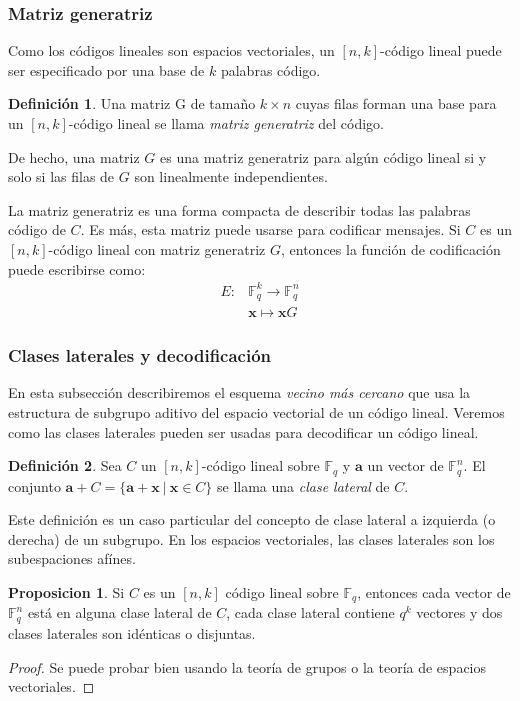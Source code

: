 \documentclass[a4paper,11pt]{article}
\numberwithin{equation}{section}
\theoremstyle{definition} %
\newtheorem{proposicion}{Proposicion}[section]
\newtheorem{definicion}{Definición}[section]
\renewcommand{\a}{\mathbf{a}}
\newcommand{\x}{\mathbf{x}}
\newcommand{\Fq}{\mathbb{F}_q}
\newcommand{\Fqn}{\mathbb{F}_q^n}
\newcommand{\Fqk}{\mathbb{F}_q^k}
\begin{document}
    \subsubsection{Matriz generatriz}

    Como los códigos lineales son espacios vectoriales, un $[n, k]$-código lineal puede ser especificado por una base de $k$ palabras código.

    \begin{definicion}
        Una matriz G de tamaño $k \times n$ cuyas filas forman una base para un $[n, k]$-código lineal se llama \emph{matriz generatriz} del código.
    \end{definicion}

    De hecho, una matriz $G$ es una matriz generatriz para algún código lineal si y solo si las filas de $G$ son linealmente independientes.

    La matriz generatriz es una forma compacta de describir todas las palabras código de $C$. Es más, esta matriz puede usarse para codificar mensajes. Si $C$ es un $[n, k]$-código lineal con matriz generatriz $G$, entonces la función de codificación puede escribirse como:
    \begin{align*}
        E: &\Fqk \to \Fqn\\
        &\x \mapsto \x G
    \end{align*}

    \subsubsection{Clases laterales y decodificación}

    En esta subsección describiremos el esquema \emph{vecino más cercano} que usa la estructura de subgrupo aditivo del espacio vectorial de un código lineal. Veremos como las clases laterales pueden ser usadas para decodificar un código lineal.

    \begin{definicion}
        Sea $C$ un $[n, k]$-código lineal sobre $\Fq$ y $\a$ un vector de $\Fqn$. El conjunto $\a + C = \{\a + \x\ |\ \x \in C\}$ se llama una \emph{clase lateral} de $C$.

        Este definición es un caso particular del concepto de clase lateral a izquierda (o derecha) de un subgrupo. En los espacios vectoriales, las clases laterales son los subespaciones afínes.
    \end{definicion}

    \begin{proposicion}
        Si $C$ es un $[n, k]$ código lineal sobre $\Fq$, entonces cada vector de $\Fqn$ está en alguna clase lateral de $C$, cada clase lateral contiene $q^k$ vectores y dos clases laterales son idénticas o disjuntas.
    \end{proposicion}
    \begin{proof}
        Se puede probar bien usando la teoría de grupos o la teoría de espacios vectoriales.
    \end{proof}
\end{document}
